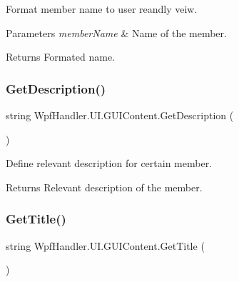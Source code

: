 Format member name to user reandly veiw. 


\begin{DoxyParams}{Parameters}
{\em member\+Name} & Name of the member.\\
\hline
\end{DoxyParams}
\begin{DoxyReturn}{Returns}
Formated name.
\end{DoxyReturn}
\mbox{\label{class_wpf_handler_1_1_u_i_1_1_g_u_i_content_a98ca8cae768fad4160df1aba48d6f7f6}} 
\subsubsection{\texorpdfstring{Get\+Description()}{GetDescription()}}
{\footnotesize\ttfamily string Wpf\+Handler.\+U\+I.\+G\+U\+I\+Content.\+Get\+Description (\begin{DoxyParamCaption}{ }\end{DoxyParamCaption})}



Define relevant description for certain member. 

\begin{DoxyReturn}{Returns}
Relevant description of the member.
\end{DoxyReturn}
\mbox{\label{class_wpf_handler_1_1_u_i_1_1_g_u_i_content_a06b4859ce09ed1dc91545154cdb9d5c3}} 
\subsubsection{\texorpdfstring{Get\+Title()}{GetTitle()}\hspace{0.1cm}{\footnotesize\ttfamily [1/2]}}
{\footnotesize\ttfamily string Wpf\+Handler.\+U\+I.\+G\+U\+I\+Content.\+Get\+Title (\begin{DoxyParamCaption}{ }\end{DoxyParamCaption})}



